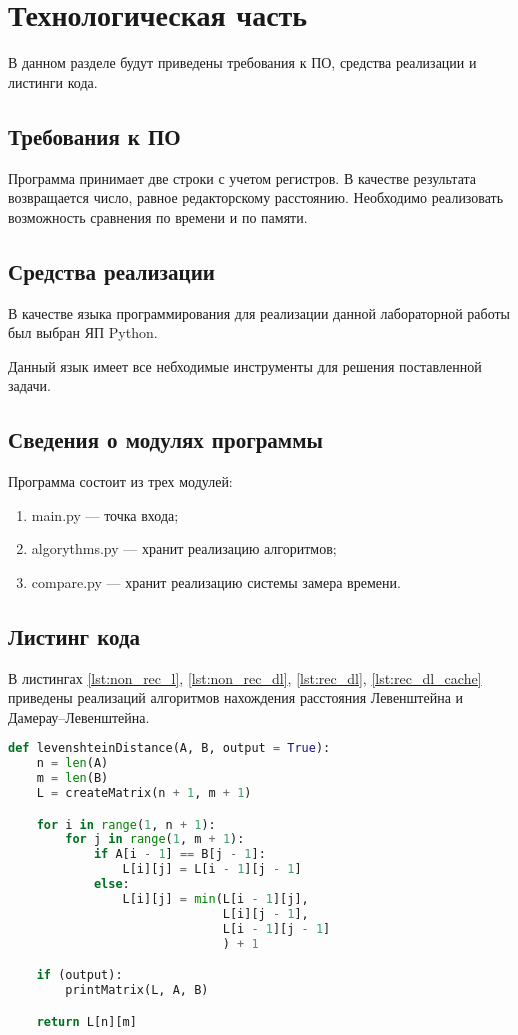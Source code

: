 \chapter{Технологическая часть}

В данном разделе будут приведены требования к ПО, средства реализации и листинги кода.

\section{Требования к ПО}

Программа принимает две строки с учетом регистров. В качестве результата возвращается число, равное редакторскому расстоянию. Необходимо реализовать возможность сравнения по времени и по памяти.

\section{Средства реализации}

В качестве языка программирования для реализации данной лабораторной работы был выбран ЯП Python. 

Данный язык имеет все небходимые инструменты для решения поставленной задачи.

\section{Сведения о модулях программы}
Программа состоит из трех модулей:
\begin{enumerate}[label={\arabic*)}]
    \item main.py --- точка входа;
	\item algorythms.py --- хранит реализацию алгоритмов;
	\item compare.py --- хранит реализацию системы замера времени.
\end{enumerate}


\section{Листинг кода}

 В листингах \ref{lst:non_rec_l}, \ref{lst:non_rec_dl}, \ref{lst:rec_dl}, \ref{lst:rec_dl_cache} приведены реализаций алгоритмов нахождения расстояния Левенштейна и Дамерау--Левенштейна.

\begin{lstlisting}[language = Python, label=lst:non_rec_l,caption=Функция нахождения расстояния Левенштейна нерекурсивным методом]
def levenshteinDistance(A, B, output = True):
	n = len(A)
	m = len(B)
	L = createMatrix(n + 1, m + 1)

	for i in range(1, n + 1):
		for j in range(1, m + 1):
			if A[i - 1] == B[j - 1]:
				L[i][j] = L[i - 1][j - 1]
			else:
				L[i][j] = min(L[i - 1][j], 
							  L[i][j - 1],
							  L[i - 1][j - 1]
							  ) + 1

	if (output):
		printMatrix(L, A, B)

	return L[n][m]
	
\end{lstlisting}

